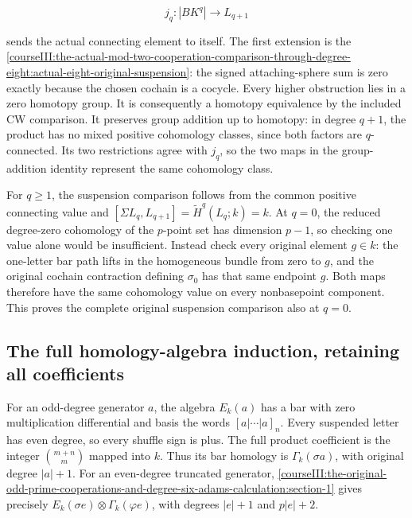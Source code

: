 \begin{equation}
j_q:|BK^q|\longrightarrow L_{q+1}
 \label{courseIII:the-original-odd-prime-cooperations-and-degree-six-adams-calculation:eq:2.4}
\end{equation}

sends the actual connecting element to itself. The first extension is the \cref{courseIII:the-actual-mod-two-cooperation-comparison-through-degree-eight:actual-eight-original-suspension}: the signed attaching-sphere sum is zero exactly because the chosen cochain is a cocycle. Every higher obstruction lies in a zero homotopy group. It is consequently a homotopy equivalence by the included CW comparison. It preserves group addition up to homotopy: in degree \(q+1\), the product has no mixed positive cohomology classes, since both factors are \(q\)-connected. Its two restrictions agree with \(j_q\), so the two maps in the group-addition identity represent the same cohomology class.

For \(q\geq1\), the suspension comparison follows from the common positive connecting value and
\([\Sigma L_q,L_{q+1}]=\widetilde H^q(L_q;k)=k\). At \(q=0\), the reduced degree-zero cohomology of the \(p\)-point set has dimension \(p-1\), so checking one value alone would be insufficient. Instead check every original element \(g\in k\): the one-letter bar path lifts in the homogeneous bundle from zero to \(g\), and the original cochain contraction defining \(\sigma_0\) has that same endpoint \(g\). Both maps therefore have the same cohomology value on every nonbasepoint component. This proves the complete original suspension comparison also at \(q=0\).

\subsection{The full homology-algebra induction, retaining all coefficients}
\label{courseIII:the-original-odd-prime-cooperations-and-degree-six-adams-calculation:odd-full-induction}

\label{courseIII:the-original-odd-prime-cooperations-and-degree-six-adams-calculation:section-3}\label{courseIII:odd-coop:3}

For an odd-degree generator \(a\), the algebra \(E_k(a)\) has a bar with zero multiplication differential and basis the words \([a|\cdots|a]_n\). Every suspended letter has even degree, so every shuffle sign is plus. The full product coefficient is the integer \(\binom{m+n}{m}\) mapped into \(k\). Thus its bar homology is \(\Gamma_k(\sigma a)\), with original degree \(|a|+1\). For an even-degree truncated generator, \cref{courseIII:the-original-odd-prime-cooperations-and-degree-six-adams-calculation:section-1} gives precisely \(E_k(\sigma e)\otimes\Gamma_k(\varphi e)\), with degrees \(|e|+1\) and \(p|e|+2\).

